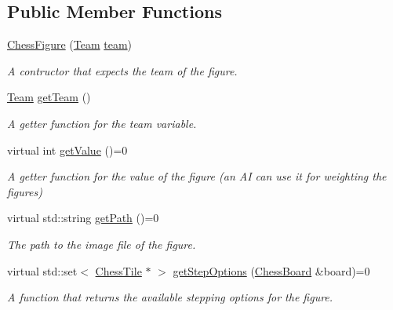\subsection*{Public Member Functions}
\begin{DoxyCompactItemize}
\item 
\mbox{\hyperlink{classChessFigure_a09347f3c6276fc99ec111e44d2095c88}{Chess\+Figure}} (\mbox{\hyperlink{classChessFigure_a62f54318c1f28a08e6a6a2707f697a1d}{Team}} \mbox{\hyperlink{classChessFigure_ac7d0751a28c94d49927b9524390d1261}{team}})
\begin{DoxyCompactList}\small\item\em A contructor that expects the team of the figure. \end{DoxyCompactList}\item 
\mbox{\label{classChessFigure_a7680676e4b3089ee8c0b1a424c71ec35}} 
\mbox{\hyperlink{classChessFigure_a62f54318c1f28a08e6a6a2707f697a1d}{Team}} \mbox{\hyperlink{classChessFigure_a7680676e4b3089ee8c0b1a424c71ec35}{get\+Team}} ()
\begin{DoxyCompactList}\small\item\em A getter function for the team variable. \end{DoxyCompactList}\item 
\mbox{\label{classChessFigure_a5024e1c8c06e0e769c119de2d63a5ab8}} 
virtual int \mbox{\hyperlink{classChessFigure_a5024e1c8c06e0e769c119de2d63a5ab8}{get\+Value}} ()=0
\begin{DoxyCompactList}\small\item\em A getter function for the value of the figure (an AI can use it for weighting the figures) \end{DoxyCompactList}\item 
\mbox{\label{classChessFigure_aa8eef5ce3812121d417499cc7ab8b0b1}} 
virtual std\+::string \mbox{\hyperlink{classChessFigure_aa8eef5ce3812121d417499cc7ab8b0b1}{get\+Path}} ()=0
\begin{DoxyCompactList}\small\item\em The path to the image file of the figure. \end{DoxyCompactList}\item 
virtual std\+::set$<$ \mbox{\hyperlink{classChessTile}{Chess\+Tile}} $\ast$ $>$ \mbox{\hyperlink{classChessFigure_ae78d52e35c4ea926f492d211c69758bd}{get\+Step\+Options}} (\mbox{\hyperlink{classChessBoard}{Chess\+Board}} \&board)=0
\begin{DoxyCompactList}\small\item\em A function that returns the available stepping options for the figure. \end{DoxyCompactList}\end{DoxyCompactItemize}
